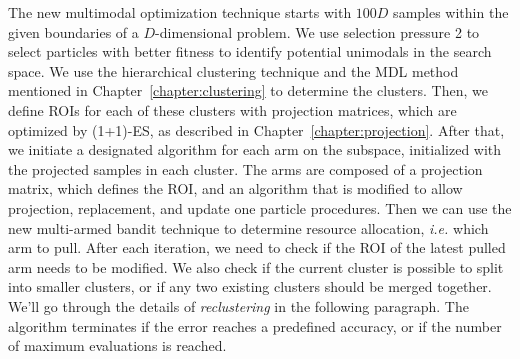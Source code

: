 The new multimodal optimization technique starts with $100D$ samples within the given boundaries of a $D$-dimensional problem.
We use selection pressure 2 to select particles with better fitness to identify potential unimodals in the search space.
We use the hierarchical clustering technique and the MDL method mentioned in Chapter~\ref{chapter:clustering} to determine the clusters.
Then, we define ROIs for each of these clusters with projection matrices, 
which are optimized by (1+1)-ES, as described in Chapter~\ref{chapter:projection}.
After that, we initiate a designated algorithm for each arm on the subspace, initialized with the projected samples in each cluster.
The arms are composed of a projection matrix, which defines the ROI, 
and an algorithm that is modified to allow projection, replacement, and update one particle procedures.
Then we can use the new multi-armed bandit technique to determine resource allocation, \textit{i.e.} which arm to pull. 
After each iteration, we need to check if the ROI of the latest pulled arm needs to be modified.
We also check if the current cluster is possible to split into smaller clusters, or if any two existing clusters should be merged together.
We'll go through the details of \textit{reclustering} in the following paragraph.
The algorithm terminates if the error reaches a predefined accuracy, or if the number of maximum evaluations is reached.





%
%
%
%
%





